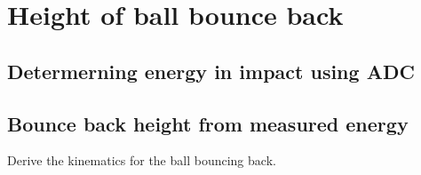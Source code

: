 \chapter{Height of ball bounce back}
\label{bounceBack}

\section{Determerning energy in impact using ADC}

\section{Bounce back height from measured energy}
Derive the kinematics for the ball bouncing back.